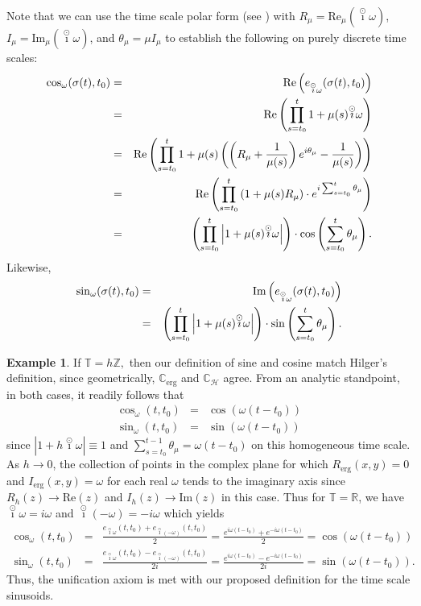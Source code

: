 \documentclass[reqno]{amsart}
\theoremstyle{plain}
\theoremstyle{definition}
\newtheorem{example}{Example}
\numberwithin{theorem}{section}
\numberwithin{definition}{section}
\numberwithin{prop}{section}
\numberwithin{example}{section}
\newcommand{\R}{\ensuremath{\mathbb{R}}}
\newcommand{\T}{\ensuremath{\mathbb{T}}}
\newcommand{\Cerg}{\ensuremath{\mathbb{C}_{\text{erg}}}}
\newcommand{\Chilg}{\ensuremath{\mathbb{C}_{\mathcal H}}}
\newcommand{\Rerg}{\ensuremath{R_{\text{erg}}}}
\newcommand{\Ierg}{\ensuremath{I_{\text{erg}}}}
\def\icirc{\overset{\odot}{\imath}}
\begin{document}
Note that we can use the time scale polar form (see \cite{JaDaPo}) with $R_\mu=\text{Re}_{\mu}( \icirc \omega)$, $I_\mu=\text{Im}_\mu(\icirc \omega)$, and $\theta_\mu=\mu I_\mu$ to establish the following on purely discrete time scales:
\begin{eqnarray}
    \cos_\omega(\sigma(t),t_0) & = & \text{Re}\left(e_{\icirc \omega}(\sigma(t),t_0)\right) \notag \\
    & = & \text{Re}\left(\prod_{s=t_0}^{t} 1+\mu(s) \icirc \omega \right) \notag \\
    & = & \text{Re}\left(\prod_{s=t_0}^{t} 1+\mu(s) \left(\left(R_\mu+\frac{1}{\mu(s)}\right)e^{i \theta_\mu}-\frac{1}{\mu(s)}\right) \right) \notag \\
    & = & \text{Re}\left(\prod_{s=t_0}^{t}\left(1+\mu(s) R_\mu\right) \cdot e^{i \sum_{s=t_0}^{t} \theta_\mu}\right) \notag \\
    & = & \left(\prod_{s=t_0}^{t} \left|1+\mu(s) \icirc \omega \right|\right) \cdot \cos\left(\sum_{s=t_0}^{t} \theta_\mu\right). \label{Pcospol}
\end{eqnarray}
Likewise,
\begin{eqnarray*}
    \sin_\omega(\sigma(t),t_0) & = & \text{Im}\left(e_{\icirc \omega}(\sigma(t),t_0)\right) \notag\\
    & = & \left(\prod_{s=t_0}^{t} \left|1+\mu(s) \icirc \omega \right|\right) \cdot \sin\left(\sum_{s=t_0}^{t} \theta_\mu\right). \label{Psinpol}
\end{eqnarray*}
\begin{example}
    If $\mathbb{T}=h\mathbb{Z},$ then our definition of sine and cosine match Hilger's definition, since geometrically, $\Cerg$ and $\Chilg$ agree.  From an analytic standpoint, in both cases, it readily follows that 
    \begin{eqnarray*}
    \cos_{\omega}(t,t_0) & = & \cos(\omega (t-t_0)) \\
    \sin_\omega(t,t_0) & = & \sin(\omega(t-t_0))
    \end{eqnarray*}
    since $|1+h \icirc \omega| \equiv 1$ and $\sum_{s=t_0}^{t-1} \theta_\mu=\omega (t-t_0)$ on this homogeneous time scale.  As $h \to 0$, the collection of points in the complex plane for which $\Rerg(x,y)=0$ and $\Ierg(x,y)=\omega$ for each real $\omega$ tends to the imaginary axis since $R_h(z)\to \text{Re}(z)$ and $I_h(z) \to \text{Im}(z)$ in this case.  Thus for $\T=\R$, we have $\icirc \omega=i \omega$ and $\icirc(- \omega)=-i \omega$ which yields
    \begin{eqnarray*}
    \cos_\omega(t,t_0) & = & \frac{e_{\icirc \omega}(t,t_0) + e_{\icirc (-\omega)}(t,t_0)}{2}=\frac{e^{i \omega (t-t_0)}+e^{-i \omega (t-t_0)}}{2} = \cos (\omega (t-t_0)) \\
    \sin_\omega(t,t_0) & = &  \frac{e_{\icirc \omega}(t,t_0) - e_{\icirc (-\omega)}(t,t_0)}{2i} =\frac{e^{i \omega (t-t_0)}-e^{-i \omega (t-t_0)}}{2i}= \sin (\omega (t-t_0)).
    \end{eqnarray*}
    Thus, the unification axiom is met with our proposed definition for the time scale sinusoids.
\end{example}
\end{document}
